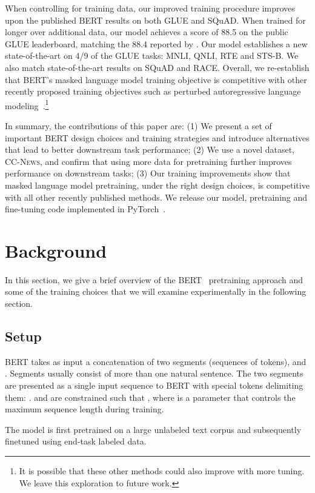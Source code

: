 \documentclass[11pt]{article}
\begin{document}
When controlling for training data, our improved training procedure improves upon the published BERT results on both GLUE and SQuAD.
When trained for longer over additional data, our model achieves a score of 88.5 on the public GLUE leaderboard, matching the 88.4 reported by .
Our model establishes a new state-of-the-art on 4/9 of the GLUE tasks: MNLI, QNLI, RTE and STS-B.
We also match state-of-the-art results on SQuAD and RACE.
Overall, we re-establish that BERT's masked language model training objective is competitive with other recently proposed training objectives such as perturbed autoregressive language modeling~\cite{yang2019xlnet}.\footnote{It is possible that these other methods could also improve with more tuning. We leave this exploration to future work.}

In summary, the contributions of this paper are: (1) We present a set of important BERT design choices and training strategies and introduce alternatives that lead to better downstream task performance; (2) We use a novel dataset, \textsc{CC-News}, and confirm that using more data for pretraining further improves performance on downstream tasks; (3) Our training improvements show that masked language model pretraining, under the right design choices, is competitive with all other recently published methods. We release our model, pretraining and fine-tuning code implemented in PyTorch~\cite{paszke2017automatic}. \section{Background} \label{sec:background}

In this section, we give a brief overview of the BERT~\cite{devlin2018bert} pretraining approach and some of the training choices that we will examine experimentally in the following section.

\subsection{Setup}
BERT takes as input a concatenation of two segments (sequences of tokens),  and .
Segments usually consist of more than one natural sentence.
The two segments are presented as a single input sequence to BERT with special tokens delimiting them: .
 and  are constrained such that , where  is a parameter that controls the maximum sequence length during training.

The model is first pretrained on a large unlabeled text corpus and subsequently finetuned using end-task labeled data.
\end{document}
